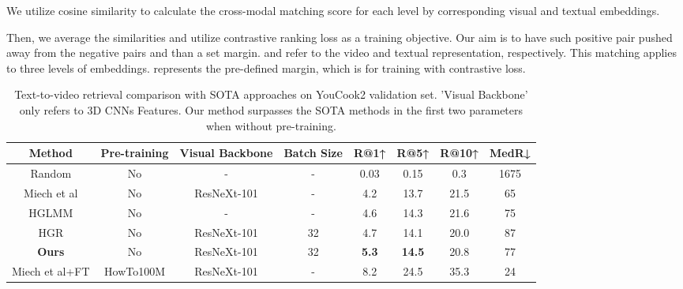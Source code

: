 \documentclass{article}
\begin{document}
We utilize cosine similarity to calculate the cross-modal matching score for each level by corresponding visual and textual embeddings.



Then, we average the similarities and utilize contrastive ranking loss as a training objective. Our aim is to have such positive pair  pushed away from the negative pairs  and  than a set margin.  and  refer to the video and textual representation, respectively. This matching applies to three levels of embeddings.  represents the pre-defined margin, which is for training with contrastive loss.



\begin{table*}[htb!]
\centering
\caption{Text-to-video retrieval comparison with SOTA approaches on YouCook2 validation set. 'Visual Backbone' only refers to 3D CNNs Features. Our method surpasses the SOTA methods in the first two parameters when without pre-training.}
\label{tab:comparison}
\begin{tabular}{|c|c|c|c|c|c|c|c|}
\hline
\textbf{Method} & \textbf{Pre-training} & \textbf{Visual Backbone} & \textbf{Batch Size} & \textbf{R@1↑} & \textbf{R@5↑}  & \textbf{R@10↑} & \textbf{MedR↓} \\ \hline
Random          & No                    & -                        & -                   & 0.03         & 0.15          & 0.3           & 1675          \\ 
Miech et al \cite{miech19howto100m}     & No                    & ResNeXt-101              & -                   & 4.2          & 13.7          & 21.5          & 65            \\ 
HGLMM \cite{hglmm}           & No                    & -                        & -                   & 4.6          & 14.3          & 21.6          & 75            \\ 
HGR \cite{Chen_2020_CVPR}            & No                    & ResNeXt-101              & 32                  & 4.7          & 14.1          & 20.0          & 87            \\ 
\textbf{Ours}            & No                    & ResNeXt-101              & 32                  & \textbf{5.3} & \textbf{14.5} & 20.8          & 77            \\ \hline \hline
Miech et al+FT \cite{miech19howto100m}  & HowTo100M             & ResNeXt-101              & -                   & 8.2          & 24.5          & 35.3          & 24            \\ 

\end{tabular}
\end{table*}
\end{document}
